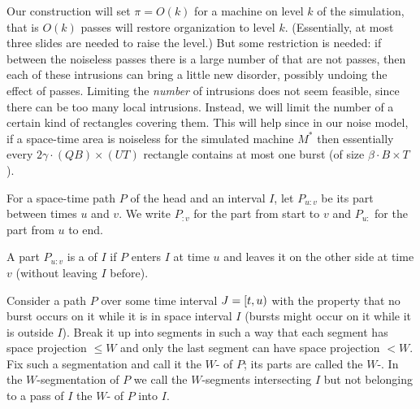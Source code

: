 \documentclass[11pt]{memoir}
\theoremstyle{definition} %
\renewcommand{\le}{\leq}
\def\B{B}
\def\U{U}
\newcommand{\passno}{\pi}
\newcommand{\Q}{Q}
\newcommand{\Tu}{T}
\begin{document}
Our construction will set \( \passno=O(k) \) for a machine on level \( k \) of the simulation,
that is \( O(k) \) passes will restore organization to level \( k \).
(Essentially, at most three slides are needed to raise the level.)
But some restriction is needed: if between the noiseless passes there is a large number of
 that are not passes, then each of these intrusions can bring a little new disorder, possibly
undoing the effect of passes.
Limiting the \emph{number}
of intrusions does not seem feasible, since there can be too many local intrusions.
Instead, we will limit the number of a certain kind of rectangles covering them.
This will help since
in our noise model, if a space-time area is noiseless for the simulated machine \( M^{*} \)
then essentially every \( 2\gamma\cdot (\Q\B)\times (\U\Tu) \) rectangle contains at most one burst
(of size \( \beta\cdot \B\times \Tu \)).

\begin{definition}
  For a space-time path \( P \) of the head and an interval \( I \),
let \( P_{u:v} \) be its part between times \( u \) and \( v \).
We write \( P_{:v} \) for the part from start to \( v \) and \( P_{u:} \)
for the part from \( u \) to end.

A part \( P_{u:v} \)
is a  of \( I \) if \( P \) enters \( I \) at time \( u \) and leaves it on the other side
at time \( v \) (without leaving \( I \) before).
\end{definition}


\begin{definition}[\( W \)-segments]\label{def:segments}
  Consider a path \( P \) over some time interval \( J=\left[t,u\right) \)
  with the property that no burst occurs on it while it is in space interval \( I \)
  (bursts might occur on it while it is outside \( I \)).
  Break it up into segments in such a way
  that each segment has space projection \( \le W \) and only the last segment
  can have space projection \( <W \).
  Fix such a segmentation and call it the
  \( W \)- of \( P \); its parts are called the  \( W \)-.
  In the \( W \)-segmentation of \( P \) we call the \( W \)-segments intersecting \( I \)
  but not belonging to a pass of \( I \) the \( W \)- of \( P \) into \( I \).
\end{definition}
\end{document}
